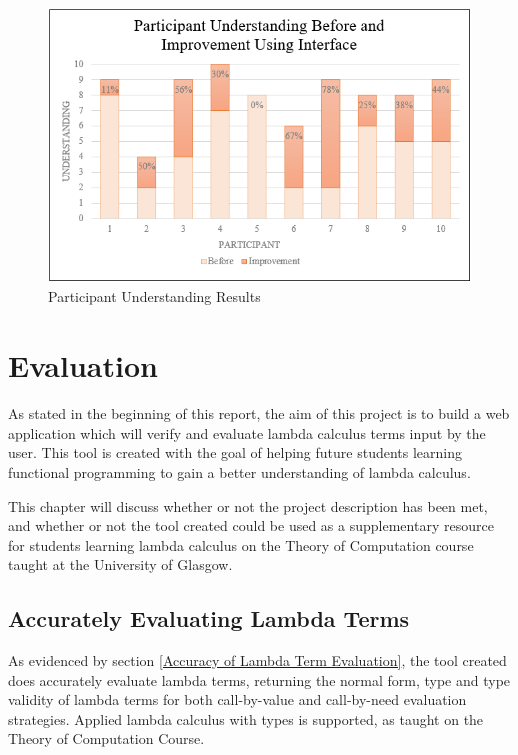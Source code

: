 \documentclass[a4paper,11pt]{report}
\begin{document}

\begin{figure}[h]
	\includegraphics{images/participant_understanding}
	\centering
	\caption{Participant Understanding Results}
	\label{participant_understanding}
\end{figure}

\chapter{Evaluation}

As stated in the beginning of this report, the aim of this project is to build a web application which will verify and evaluate lambda calculus terms input by the user. This tool is created with the goal of helping future students learning functional programming to gain a better understanding of lambda calculus.

This chapter will discuss whether or not the project description has been met, and whether or not the tool created could be used as a supplementary resource for students learning lambda calculus on the Theory of Computation course taught at the University of Glasgow.

\section{Accurately Evaluating Lambda Terms}
As evidenced by section \ref{Accuracy of Lambda Term Evaluation}, the tool created does accurately evaluate lambda terms, returning the normal form, type and type validity of lambda terms for both call-by-value and call-by-need evaluation strategies. Applied lambda calculus with types is supported, as taught on the Theory of Computation Course.
\end{document}

